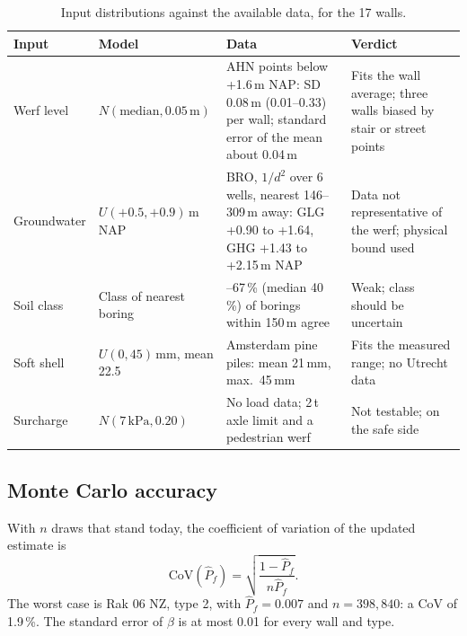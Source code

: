 \begin{table}[htbp]
\centering
\small
\caption{Input distributions against the available data, for the 17 walls.}
\label{tab:prob-data}
\begin{tabularx}{\textwidth}{@{}l >{\raggedright\arraybackslash}p{3.4cm}
  >{\raggedright\arraybackslash}X >{\raggedright\arraybackslash}p{3.6cm}@{}}
\toprule
Input & Model & Data & Verdict \\
\midrule
Werf level & $N(\text{median}, 0.05\,\text{m})$ &
  AHN points below +1.6\,m NAP: SD 0.08\,m (0.01--0.33) per wall; standard error of the mean about 0.04\,m &
  Fits the wall average; three walls biased by stair or street points \\
Groundwater & $U(+0.5, +0.9)$\,m NAP &
  BRO, $1/d^2$ over 6 wells, nearest 146--309\,m away: GLG +0.90 to +1.64, GHG +1.43 to +2.15\,m NAP &
  Data not representative of the werf; physical bound used \\
Soil class & Class of nearest boring &
  25--67\,\% (median 40\,\%) of borings within 150\,m agree &
  Weak; class should be uncertain \\
Soft shell & $U(0, 45)$\,mm, mean 22.5 &
  Amsterdam pine piles: mean 21\,mm, max.\ 45\,mm \cite{hemel2023} &
  Fits the measured range; no Utrecht data \\
Surcharge & $N(7\,\text{kPa}, 0.20)$ &
  No load data; 2\,t axle limit and a pedestrian werf &
  Not testable; on the safe side \\
\bottomrule
\end{tabularx}
\end{table}

\subsection{Monte Carlo accuracy}\label{app:prob-mc}

With $n$ draws that stand today, the coefficient of variation of the updated
estimate is
\begin{equation}
\text{CoV}(\hat P_f) = \sqrt{\frac{1 - \hat P_f}{n \hat P_f}}.
\end{equation}
The worst case is Rak 06 NZ, type 2, with $\hat P_f = 0.007$ and
$n = 398{,}840$: a CoV of 1.9\,\%. The standard error of $\beta$ is at most
0.01 for every wall and type.
